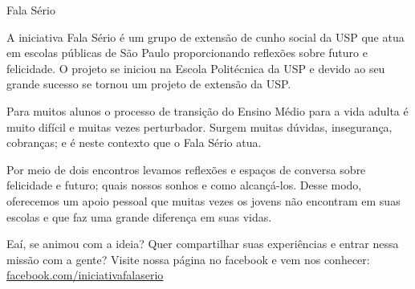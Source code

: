 \begin{secao}{Fala Sério}

A iniciativa Fala Sério é um grupo de extensão de cunho social da USP que atua em
escolas públicas de São Paulo proporcionando reflexões sobre futuro e felicidade.
O projeto se iniciou na Escola Politécnica da USP e devido ao seu grande sucesso 
se tornou um projeto de extensão da USP.

Para muitos alunos o processo de transição do Ensino Médio para a vida adulta é 
muito difícil e muitas vezes perturbador. Surgem muitas dúvidas, insegurança, 
cobranças; e é neste contexto que o Fala Sério atua.

Por meio de dois encontros levamos reflexões e espaços de conversa sobre 
felicidade e futuro; quais nossos sonhos e como alcançá-los. Desse modo, 
oferecemos um apoio pessoal que muitas vezes os jovens não encontram em suas 
escolas e que faz uma grande diferença em suas vidas.

Eaí, se animou com a ideia? Quer compartilhar suas experiências e entrar nessa 
missão com a gente? Visite nossa página no facebook e vem nos conhecer:
\url{facebook.com/iniciativafalaserio}

\end{secao}
